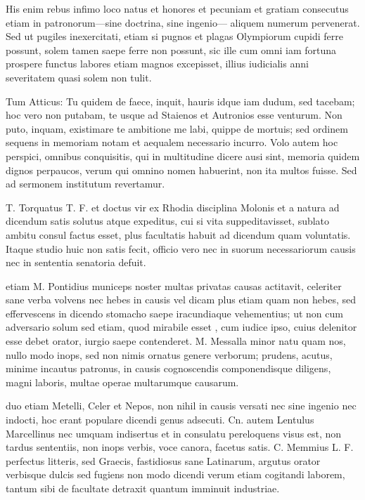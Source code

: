  His enim rebus infimo loco natus et honores et pecuniam et gratiam consecutus etiam in patronorum—sine doctrina, sine ingenio— aliquem numerum pervenerat. Sed ut pugiles inexercitati, etiam si pugnos et plagas Olympiorum cupidi ferre possunt, solem tamen saepe ferre non possunt, sic ille cum omni iam fortuna prospere functus labores etiam magnos excepisset, illius iudicialis anni severitatem quasi solem non tulit.

 Tum Atticus: Tu quidem de faece, inquit, hauris idque iam dudum, sed tacebam; hoc vero non putabam, te usque ad Staienos et Autronios esse venturum. Non puto, inquam, existimare te ambitione me labi, quippe de mortuis; sed ordinem sequens in memoriam notam et aequalem necessario incurro. Volo autem hoc perspici, omnibus conquisitis, qui in multitudine dicere ausi sint, memoria quidem dignos perpaucos, verum qui omnino nomen habuerint, non ita multos fuisse. Sed ad sermonem institutum revertamur.

 T. Torquatus T. F. et doctus vir ex Rhodia disciplina Molonis et a natura ad dicendum satis solutus atque expeditus, cui si vita suppeditavisset, sublato ambitu consul factus esset, plus facultatis habuit ad dicendum quam voluntatis. Itaque studio huic non satis fecit, officio vero nec in suorum necessariorum causis nec in sententia senatoria defuit.

 etiam M. Pontidius municeps noster multas privatas causas actitavit, celeriter sane verba volvens nec hebes in causis vel dicam plus etiam quam non hebes, sed effervescens in dicendo stomacho saepe iracundiaque vehementius; ut non cum adversario solum sed etiam, quod mirabile esset , cum iudice ipso, cuius delenitor esse debet orator, iurgio saepe contenderet. M. Messalla minor natu quam nos, nullo modo inops, sed non nimis ornatus genere verborum; prudens, acutus, minime incautus patronus, in causis cognoscendis componendisque diligens, magni laboris, multae operae multarumque causarum.

 duo etiam Metelli, Celer et Nepos, non nihil in causis versati nec sine ingenio nec indocti, hoc erant populare dicendi genus adsecuti. Cn. autem Lentulus Marcellinus nec umquam indisertus et in consulatu pereloquens visus est, non tardus sententiis, non inops verbis, voce canora, facetus satis. C. Memmius L. F. perfectus litteris, sed Graecis, fastidiosus sane Latinarum, argutus orator verbisque dulcis sed fugiens non modo dicendi verum etiam cogitandi laborem, tantum sibi de facultate detraxit quantum imminuit industriae.

